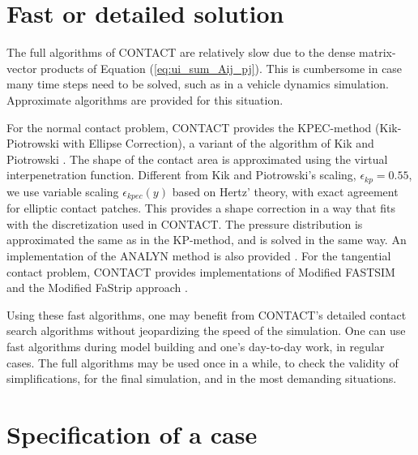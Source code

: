 \documentclass[12pt]{report}
\begin{document}
\section{Fast or detailed solution}
\label{sec:fast_detailed}

The full algorithms of CONTACT are relatively slow due to the dense
matrix-vector products of Equation (\ref{eq:ui_sum_Aij_pj}). This is
cumbersome in case many time steps need to be solved, such as in a
vehicle dynamics simulation. Approximate algorithms are provided for
this situation.

For the normal contact problem, CONTACT provides the KPEC-method
(Kik-Piotrowski with Ellipse Correction),
a variant of the algorithm of Kik and Piotrowski \cite{Kik1996,
Piotrowski2008}. The shape of the contact area is approximated using the
virtual interpenetration function. Different from Kik and Piotrowski's scaling,
$\epsilon_{kp}=0.55$, we use variable scaling $\epsilon_{kpec}(y)$ based
on Hertz' theory, with exact agreement for elliptic contact patches. This
provides a shape correction in a way that fits with the discretization
used in CONTACT. The pressure distribution is approximated the same as in
the KP-method, and is solved in the same way. 
An implementation of the ANALYN method is also provided \cite{Sichani2014b}.
For the tangential contact problem, CONTACT provides implementations of
Modified FASTSIM \cite{Spiryagin2013} and the Modified FaStrip approach
\cite{Vollebregt2025a-indicators}.

Using these fast algorithms, one may benefit from CONTACT's detailed
contact search algorithms without jeopardizing the speed of the simulation.
One can use fast algorithms during model building and one's day-to-day
work, in regular cases. The full algorithms may be used once in a while,
to check the validity of simplifications, for the final simulation, and in
the most demanding situations.

\section{Specification of a case}
\end{document}
